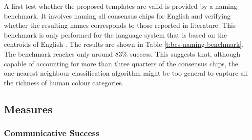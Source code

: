 A first test whether the proposed templates are valid is provided by a
naming benchmark. It
involves naming all consensus chips for English
\citep{sturges95location} and verifying whether the resulting names
corresponds to those reported in literature. This benchmark is only
performed for the language system that is based on the centroids of
English \citep{sturges95location}. The results are shown in Table
\ref{t:bcs-naming-benchmark}. The benchmark reaches only around 83\%
success.  This suggests that, although capable of accounting for more
than three quarters of the consensus chips, the one-nearest neighbour
classification algorithm might be too general to capture all the
richness of human colour categories.

\begin{table}[htbp]
  \centering
  \normalsize
  \caption[Naming benchmark for English basic colour categories]{Number of correctly
    named consensus samples broken down by category: white (\textsc{we}), grey
    (\textsc{gy}), black (\textsc{bk}), green (\textsc{gn}), yellow (\textsc{yw}), blue (\textsc{bl}), red (\textsc{rd}), purple (\textsc{pu}), brown (\textsc{br}), orange (\textsc{or}) and pink (\textsc{pk}). The total
    number of consensus chips is shown on top.}
  \label{t:bcs-naming-benchmark}
\end{table}

\subsection{Measures}

\subsubsection{Communicative Success}


